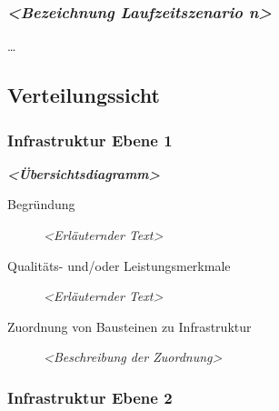 \subsubsection{\texorpdfstring{\emph{\textless{}Bezeichnung
Laufzeitszenario
n\textgreater{}}}{\textless{}Bezeichnung Laufzeitszenario n\textgreater{}}}\label{__emphasis_bezeichnung_laufzeitszenario_n_emphasis}

\ldots{}

\subsection{Verteilungssicht}\label{section-deployment-view}

\subsubsection{Infrastruktur Ebene 1}\label{_infrastruktur_ebene_1}

\emph{\textbf{\textless{}Übersichtsdiagramm\textgreater{}}}

\begin{description}
\item[Begründung]
\emph{\textless{}Erläuternder Text\textgreater{}}
\item[Qualitäts- und/oder Leistungsmerkmale]
\emph{\textless{}Erläuternder Text\textgreater{}}
\item[Zuordnung von Bausteinen zu Infrastruktur]
\emph{\textless{}Beschreibung der Zuordnung\textgreater{}}
\end{description}

\subsubsection{Infrastruktur Ebene 2}
\label{_infrastruktur_ebene_2}

